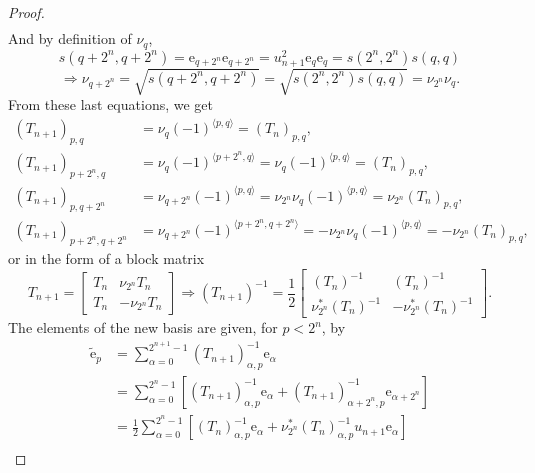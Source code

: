 \documentclass{article}
\begin{document}
\begin{proof}
\begin{equation}
\begin{aligned}
        \end{aligned}
    \end{equation}
    And by definition of $\nu_q$,
    $$ s(q+2^n, q+2^n) = \mathrm e_{q+2^n} \mathrm e_{q+2^n} = u_{n+1}^2 \mathrm e_q \mathrm e_q = s(2^n, 2^n) s(q,q) $$
    \begin{equation}
        \label{multiperplex and multicomplex diagonal basis theorem : elements nu}
        \Rightarrow \nu_{q+2^n} = \sqrt{s(q+2^n, q+2^n)} = \sqrt{s(2^n, 2^n) s(q,q)} = \nu_{2^n} \nu_q.
    \end{equation}
    From these last equations, we get
    $$
        \begin{aligned}
            (T_{n+1})_{p,q} &= \nu_q (-1)^{\langle p,q\rangle} = (T_n)_{p,q},\\
            (T_{n+1})_{p+2^n,q} &= \nu_q (-1)^{\langle p+2^n,q\rangle} = \nu_q (-1)^{\langle p,q\rangle} = (T_n)_{p,q},\\
            (T_{n+1})_{p,q+2^n} &= \nu_{q+2^n} (-1)^{\langle p,q\rangle} = \nu_{2^n}\nu_q (-1)^{\langle p,q\rangle} = \nu_{2^n}(T_n)_{p,q},\\
            (T_{n+1})_{p+2^n,q+2^n} &= \nu_{q+2^n} (-1)^{\langle p+2^n,q+2^n\rangle} = -\nu_{2^n}\nu_q (-1)^{\langle p,q\rangle} = -\nu_{2^n}(T_n)_{p,q},
        \end{aligned}
    $$
    or in the form of a block matrix
    \begin{equation}
        T_{n+1} = \begin{bmatrix}
            T_n & \nu_{2^n} T_n\\
            T_n & - \nu_{2^n} T_n
        \end{bmatrix} \Rightarrow (T_{n+1})^{-1} = \frac{1}{2} \begin{bmatrix}
            (T_n)^{-1} & (T_n)^{-1}\\
            \nu^*_{2^n} (T_n)^{-1} & - \nu^*_{2^n} (T_n)^{-1}
        \end{bmatrix}.
    \end{equation}
    The elements of the new basis are given, for $p<2^n$, by
    $$ \begin{aligned}
        \tilde{\mathrm e}_p &= \sum_{\alpha=0}^{2^{n+1}-1} (T_{n+1})^{-1}_{\alpha,p} \mathrm e_\alpha\\
        &= \sum_{\alpha=0}^{2^n-1} \left[ (T_{n+1})^{-1}_{\alpha,p} \mathrm e_\alpha+ (T_{n+1})^{-1}_{\alpha+2^n,p} \mathrm e_{\alpha+2^n} \right]\\
        &= \frac{1}{2} \sum_{\alpha=0}^{2^n-1} \left[ (T_{n})^{-1}_{\alpha,p} \mathrm e_\alpha+ \nu_{2^n}^* (T_{n})^{-1}_{\alpha,p} u_{n+1}\mathrm e_{\alpha} \right]\\

\end{aligned}$$
\end{proof}
\end{document}
